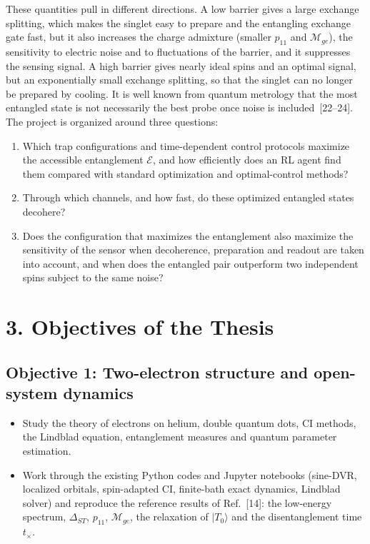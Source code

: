 \documentclass[12pt,a4paper]{article}
\begin{document}
These quantities pull in different directions.  A low barrier gives a
large exchange splitting, which makes the singlet easy to prepare and
the entangling exchange gate fast, but it also increases the charge
admixture (smaller $p_{11}$ and $\mathcal M_{ge}$), the sensitivity to
electric noise and to fluctuations of the barrier, and it suppresses
the sensing signal.  A high barrier gives nearly ideal spins and an
optimal signal, but an exponentially small exchange splitting, so that
the singlet can no longer be prepared by cooling.  It is well known
from quantum metrology that the most entangled state is not
necessarily the best probe once noise is included~[22--24].  The
project is organized around three questions:
\begin{enumerate}
  \item Which trap configurations and time-dependent control protocols
  maximize the accessible entanglement $\mathcal E$, and how
  efficiently does an RL agent find them compared with standard
  optimization and optimal-control methods?
  \item Through which channels, and how fast, do these optimized
  entangled states decohere?
  \item Does the configuration that maximizes the entanglement also
  maximize the sensitivity of the sensor when decoherence,
  preparation and readout are taken into account, and when does the
  entangled pair outperform two independent spins subject to the same
  noise?
\end{enumerate}

\section*{3. Objectives of the Thesis}

\subsection*{Objective 1: Two-electron structure and open-system dynamics}
\begin{itemize}
  \item Study the theory of electrons on helium, double quantum dots,
  CI methods, the Lindblad equation, entanglement measures and quantum
  parameter estimation.
  \item Work through the existing Python codes and Jupyter notebooks
  (sine-DVR, localized orbitals, spin-adapted CI, finite-bath exact
  dynamics, Lindblad solver) and reproduce the reference results of
  Ref.~[14]: the low-energy spectrum, $\Delta_{ST}$, $p_{11}$,
  $\mathcal M_{ge}$, the relaxation of $|T_0\rangle$ and the
  disentanglement time $t_\times$.
\end{itemize}
\end{document}
